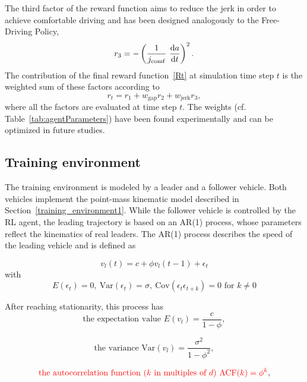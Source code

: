 \documentclass[review]{elsarticle}
\providecommand{\red}[1]{\textcolor{red}{#1}}
\providecommand{\martin}[1]{\red{#1}} %
\providecommand{\sub}[1]{_{\mathrm{#1}}}  %
\providecommand{\3}{{\ss}}
\begin{document}
The third factor of the reward function aims to reduce the jerk in
order to achieve comfortable driving and has been designed analogously to the Free-Driving Policy, 
\begin{equation}
\label{eq:r3_CFP}
r_3 = -\left(\frac{1}{j\sub{comf}} \ \dv{a}{t}\right)^2.
\end{equation}
%
The contribution of the final reward function~\eqref{Rt}  at simulation time step $t$ is the weighted
sum of these factors according to
\begin{equation}
\label{rt2}
r_t = r_1 + w\sub{gap}r_2+w\sub{jerk}r_3,
\end{equation}
where all the factors are evaluated at time step $t$. The weights (cf.
Table~\ref{tab:agentParameters}) have been found experimentally and
can be optimized in future studies.




\subsection{Training environment}
\label{training_environment2}
The training environment is modeled by a leader and a follower vehicle. Both vehicles implement the point-mass kinematic model described in Section~\ref{training_environment1}. While the follower vehicle is controlled by the RL agent, the  leading trajectory is based on an AR(1) process, whose parameters
reflect the kinematics of real leaders. The AR(1) process describes
the speed of the leading vehicle and is defined as 

\begin{equation} \label{eq:AR1}
v_l(t) = c+\phi v_l(t-1)+ \epsilon_t
\end{equation}
with
\begin{equation}
E(\epsilon_t) = 0, \ \text{Var}(\epsilon_t) = \sigma, \ 
\text{Cov}(\epsilon_t\epsilon_{t+k})=0 \text{ for }k\neq 0
\end{equation}

After reaching stationarity, this process has 
\begin{equation}
\label{eq:E_AR1}
\text{the expectation value }E(v_l) = \frac{c}{1-\phi}, 
\end{equation}

\begin{equation}
\label{eq:V_AR1}
\text{the variance }\text{Var}(v_l) = \frac{\sigma^2}{1-\phi^2}, 
\end{equation}

\begin{equation}
\label{eq:ACF_AR1}
\martin{\text{the autocorrelation function ($k$ in multiples of $d$) }
\text{ACF}(k) = \phi^{k}}, 
\end{equation}
\end{document}
